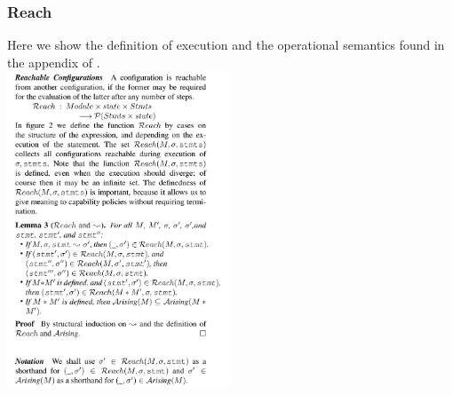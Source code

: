 \documentclass[a4paper,11pt,twoside]{article}
\begin{document}
{\subsubsection{Reach}\label{app:reach}
Here we show the definition of execution and the operational semantics found in the appendix of \cite{drossopoulou2015b}.\\

\includegraphics[trim={0 0 0 0},width=0.5\textwidth]{figures/app_reach.pdf}\linebreak
\clearpage
}
\end{document}
